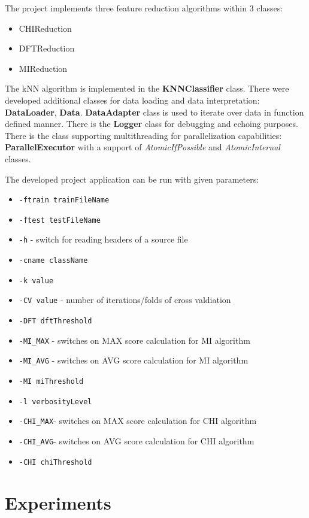 \documentclass[12pt,a4paper]{report}
\begin{document}
The project implements three feature reduction algorithms within 3 classes:
\begin{itemize}
  \item CHIReduction
  \item DFTReduction
  \item MIReduction
\end{itemize}
The kNN algorithm is implemented in the \textbf{KNNClassifier} class. There were developed additional classes for data loading and data interpretation: \textbf{DataLoader}, \textbf{Data}. \textbf{DataAdapter} class is used to iterate over data in function defined manner. There is the \textbf{Logger} class for debugging and echoing purposes. There is the class supporting multithreading  for parallelization capabilities: \textbf{ParallelExecutor} with a support of \emph{AtomicIfPossible} and \emph{AtomicInternal} classes.

The developed project application can be run with given parameters:
\begin{itemize}
  \item \texttt{-ftrain trainFileName}
  \item \texttt{-ftest testFileName}
  \item \texttt{-h} - switch for reading headers of a source file
  \item \texttt{-cname className}
  \item \texttt{-k value}
  \item \texttt{-CV value} - number of iterations/folds of cross valdiation
  \item \texttt{-DFT dftThreshold}
  \item \texttt{-MI\_MAX} - switches on MAX score calculation for MI algorithm
  \item \texttt{-MI\_AVG} - switches on AVG score calculation for MI algorithm
  \item \texttt{-MI miThreshold}
  \item \texttt{-l verbosityLevel}
  \item \texttt{-CHI\_MAX}- switches on MAX score calculation for CHI algorithm
  \item \texttt{-CHI\_AVG}- switches on AVG score calculation for CHI algorithm
  \item \texttt{-CHI chiThreshold}
\end{itemize}

\chapter{Experiments}
\end{document}
